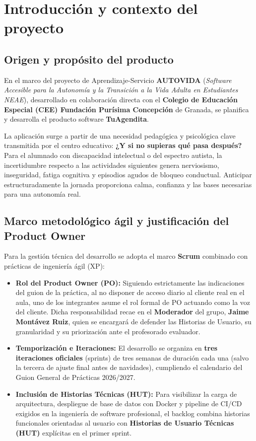 \documentclass[11pt,a4paper]{article}
\newcommand{\hl}[1]{\textcolor{gblue}{\textbf{#1}}}
\begin{document}
{\hypersetup{linkcolor=gnavy}\renewcommand{\contentsname}{\color{gblue}Índice de Contenidos}\tableofcontents}
\clearpage

\section{Introducción y contexto del proyecto}
\subsection{Origen y propósito del producto}
En el marco del proyecto de Aprendizaje-Servicio \hl{AUTOVIDA} (\textit{Software Accesible para la Autonomía y la Transición a la Vida Adulta en Estudiantes NEAE}), desarrollado en colaboración directa con el \hl{Colegio de Educación Especial (CEE) Fundación Purísima Concepción} de Granada, se planifica y desarrolla el producto software \hl{TuAgendita}.

La aplicación surge a partir de una necesidad pedagógica y psicológica clave transmitida por el centro educativo: \textbf{¿Y si no supieras qué pasa después?} Para el alumnado con discapacidad intelectual o del espectro autista, la incertidumbre respecto a las actividades siguientes genera nerviosismo, inseguridad, fatiga cognitiva y episodios agudos de bloqueo conductual. Anticipar estructuradamente la jornada proporciona calma, confianza y las bases necesarias para una autonomía real.

\subsection{Marco metodológico ágil y justificación del Product Owner}
Para la gestión técnica del desarrollo se adopta el marco \hl{Scrum} combinado con prácticas de ingeniería ágil (XP):

\begin{itemize}
\item \textbf{Rol del Product Owner (PO):} Siguiendo estrictamente las indicaciones del guion de la práctica, al no disponer de acceso diario al cliente real en el aula, uno de los integrantes asume el rol formal de PO actuando como la voz del cliente. Dicha responsabilidad recae en el \hl{Moderador} del grupo, \textbf{Jaime Montávez Ruiz}, quien se encargará de defender las Historias de Usuario, su granularidad y su priorización ante el profesorado evaluador.
\item \textbf{Temporización e Iteraciones:} El desarrollo se organiza en \hl{tres iteraciones oficiales} (sprints) de tres semanas de duración cada una (salvo la tercera de ajuste final antes de navidades), cumpliendo el calendario del Guion General de Prácticas 2026/2027.
\item \textbf{Inclusión de Historias Técnicas (HUT):} Para visibilizar la carga de arquitectura, despliegue de base de datos con Docker y pipeline de CI/CD exigidos en la ingeniería de software profesional, el backlog combina historias funcionales orientadas al usuario con \hl{Historias de Usuario Técnicas (HUT)} explícitas en el primer sprint.
\end{itemize}
\end{document}
